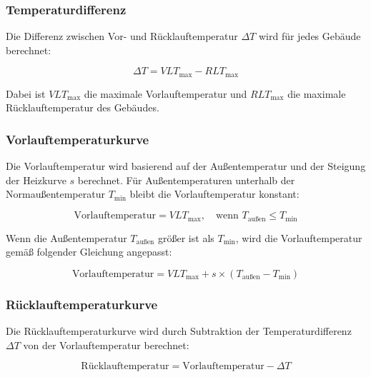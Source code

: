 \subsubsection{Temperaturdifferenz}
Die Differenz zwischen Vor- und Rücklauftemperatur \( \Delta T \) wird für jedes Gebäude berechnet:

\[
\Delta T = VLT_{\text{max}} - RLT_{\text{max}}
\]

Dabei ist \( VLT_{\text{max}} \) die maximale Vorlauftemperatur und \( RLT_{\text{max}} \) die maximale Rücklauftemperatur des Gebäudes.

\subsubsection{Vorlauftemperaturkurve}
Die Vorlauftemperatur wird basierend auf der Außentemperatur und der Steigung der Heizkurve \( s \) berechnet. Für Außentemperaturen unterhalb der Normaußentemperatur \( T_{\text{min}} \) bleibt die Vorlauftemperatur konstant:

\[
\text{Vorlauftemperatur} = VLT_{\text{max}}, \quad \text{wenn } T_{\text{außen}} \leq T_{\text{min}}
\]

Wenn die Außentemperatur \( T_{\text{außen}} \) größer ist als \( T_{\text{min}} \), wird die Vorlauftemperatur gemäß folgender Gleichung angepasst:

\[
\text{Vorlauftemperatur} = VLT_{\text{max}} + s \times (T_{\text{außen}} - T_{\text{min}})
\]

\subsubsection{Rücklauftemperaturkurve}
Die Rücklauftemperaturkurve wird durch Subtraktion der Temperaturdifferenz \( \Delta T \) von der Vorlauftemperatur berechnet:

\[
\text{Rücklauftemperatur} = \text{Vorlauftemperatur} - \Delta T
\]
